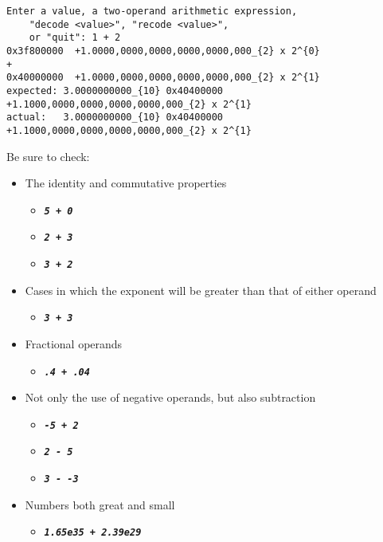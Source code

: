 \begin{verbatim}
Enter a value, a two-operand arithmetic expression,
    "decode <value>", "recode <value>",
    or "quit": 1 + 2
0x3f800000	+1.0000,0000,0000,0000,0000,000_{2} x 2^{0}
+
0x40000000	+1.0000,0000,0000,0000,0000,000_{2} x 2^{1}
expected: 3.0000000000_{10}	0x40400000	+1.1000,0000,0000,0000,0000,000_{2} x 2^{1}
actual:   3.0000000000_{10}	0x40400000	+1.1000,0000,0000,0000,0000,000_{2} x 2^{1}
\end{verbatim}

\begin{description}
\end{description}
Be sure to check:
\begin{itemize}
    \item The identity and commutative properties
    \begin{itemize}
        \item[] \texttt{\textbf{\textit{5 + 0}}}
        \item[] \texttt{\textbf{\textit{2 + 3}}}
        \item[] \texttt{\textbf{\textit{3 + 2}}}
    \end{itemize}
    \item Cases in which the exponent will be greater than that of either operand
    \begin{itemize}
        \item[] \texttt{\textbf{\textit{3 + 3}}}
    \end{itemize}
    \item Fractional operands
    \begin{itemize}
        \item[] \texttt{\textbf{\textit{.4 + .04}}}
    \end{itemize}
    \item Not only the use of negative operands, but also subtraction
    \begin{itemize}
        \item[] \texttt{\textbf{\textit{-5 + 2}}}
        \item[] \texttt{\textbf{\textit{2 - 5}}}
        \item[] \texttt{\textbf{\textit{3 - -3}}}
    \end{itemize}
    \item Numbers both great and small
    \begin{itemize}
        \item[] \texttt{\textbf{\textit{1.65e35 + 2.39e29}}}

\end{itemize}
\end{itemize}
